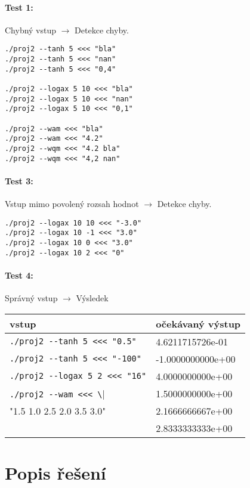 \documentclass[12pt,a4paper,titlepage,final]{article}
\begin{document}
\paragraph{Test 1:} Chybný vstup $\longrightarrow$ Detekce chyby.
\begin{verbatim}
./proj2 --tanh 5 <<< "bla"
./proj2 --tanh 5 <<< "nan"
./proj2 --tanh 5 <<< "0,4"

./proj2 --logax 5 10 <<< "bla"
./proj2 --logax 5 10 <<< "nan"
./proj2 --logax 5 10 <<< "0,1"

./proj2 --wam <<< "bla"
./proj2 --wam <<< "4.2"
./proj2 --wqm <<< "4.2 bla"
./proj2 --wqm <<< "4,2 nan"
\end{verbatim} 

\paragraph{Test 3:} Vstup mimo povolený rozsah hodnot $\longrightarrow$ Detekce
chyby.
\begin{verbatim}
./proj2 --logax 10 10 <<< "-3.0"
./proj2 --logax 10 -1 <<< "3.0"
./proj2 --logax 10 0 <<< "3.0"
./proj2 --logax 10 2 <<< "0"
\end{verbatim} 

\paragraph{Test 4:} Správný vstup $\longrightarrow$ Výsledek

\vspace{1em}\begin{tabular}{ll} %
vstup & očekávaný výstup \\
\hline
\verb|./proj2 --tanh 5 <<< "0.5"| & 4.6211715726e-01 \\
\verb|./proj2 --tanh 5 <<< "-100"| & -1.0000000000e+00 \\
\verb|./proj2 --logax 5 2 <<< "16"| & 4.0000000000e+00 \\
\verb|./proj2 --wam <<< \| & 1.5000000000e+00 \\
  "1.5 1.0 2.5 2.0 3.5 3.0" & 2.1666666667e+00 \\
& 2.8333333333e+00 \\
\end{tabular}


\section{Popis řešení} \label{reseni}
\end{document}
